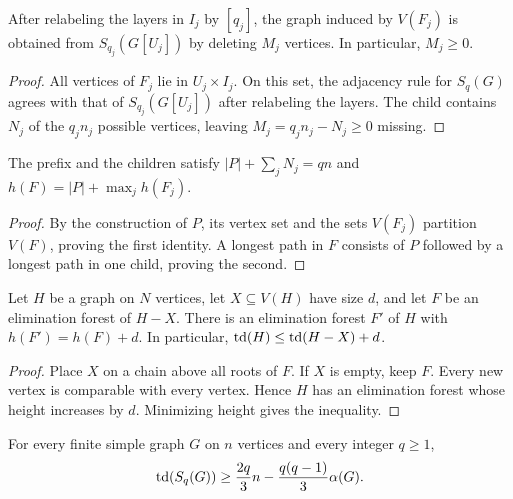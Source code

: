 \begin{lemma}
\label{lem:ugc-child-restriction}
After relabeling the layers in $I_j$ by $[q_j]$, the graph induced by
$V(F_j)$ is obtained from $S_{q_j}(G[U_j])$ by deleting $M_j$
vertices. In particular, $M_j\geq0$.
\end{lemma}

\begin{proof}
All vertices of $F_j$ lie in $U_j\times I_j$. On this set, the
adjacency rule for $S_q(G)$ agrees with that of $S_{q_j}(G[U_j])$
after relabeling the layers. The child contains $N_j$ of the
$q_jn_j$ possible vertices, leaving $M_j=q_jn_j-N_j\geq0$ missing.
\end{proof}

\begin{lemma}
\label{lem:ugc-forest-accounting}
The prefix and the children satisfy
$|P|+\sum_jN_j=qn$ and $h(F)=|P|+\max_jh(F_j)$.
\end{lemma}

\begin{proof}
By the construction of $P$, its vertex set and the sets $V(F_j)$
partition $V(F)$, proving the first identity. A longest path in $F$
consists of $P$ followed by a longest path in one child, proving
the second.
\end{proof}

\begin{lemma}\label{lem:restore-vertices}
Let $H$ be a graph on $N$ vertices, let $X\subseteq V(H)$ have size
$d$, and let $F$ be an elimination forest of $H-X$. There is an
elimination forest $F'$ of $H$ with $h(F')=h(F)+d$.
In particular, $\operatorname{td}(H)\leq\operatorname{td}(H-X)+d$.
\end{lemma}

\begin{proof}
Place $X$ on a chain above all roots of $F$. If $X$ is empty,
keep $F$. Every new vertex is comparable with every vertex. Hence
$H$ has an elimination forest whose height increases
by $d$. Minimizing height gives the inequality.
\end{proof}

\begin{theorem}\label{thm:ugc-structural}
For every finite simple graph $G$ on $n$ vertices and every integer
$q\geq1$,
\begin{equation}\label{eq:ugc-structural}
  \operatorname{td}(S_q(G))\geq
  \frac{2q}{3}n-\frac{q(q-1)}{3}\alpha(G).
\end{equation}
\end{theorem}


